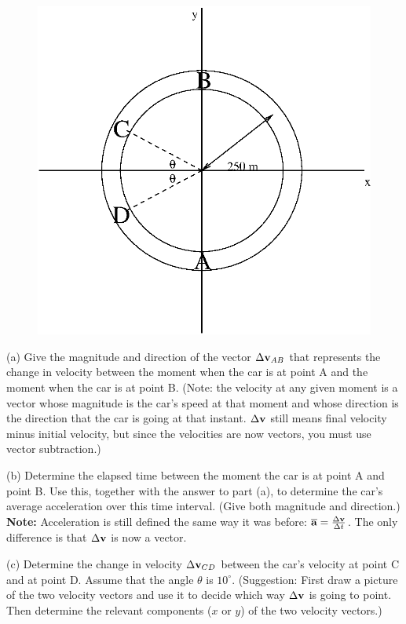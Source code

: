 \documentclass{article}
\begin{document}
\begin{figure}[h]
\centerline{\includegraphics{veclabfig.eps}}
\end{figure}

(a) Give the magnitude and direction of the vector $\Delta{\bf v}_{AB}$
that represents the change in velocity between the moment when the
car is at point A and the moment when the car is at point B.  (Note:
the velocity at any given moment is a vector whose magnitude is the
car's speed at that moment and whose direction is the direction that
the car is going at that instant.  $\Delta{\bf v}$ still means
final velocity minus initial velocity, but since the velocities are
now vectors, you must use vector subtraction.)

\vfil

(b) Determine the elapsed time between the moment the car is at point A
and point B.  Use this, together with the answer to part (a), to determine
the car's average acceleration over this time interval.  (Give both magnitude
and direction.)  {\bf Note:} Acceleration is still defined the same
way it was before: $\overline{\bf a}={\Delta {\bf v}\over\Delta t}$.
The only difference is that $\Delta{\bf v}$ is now a vector.


\vfil\eject

(c) Determine the change in velocity $\Delta {\bf v}_{CD}$ between the
car's velocity at point C and at point D.  Assume that the angle $\theta$
is $10^\circ$.  (Suggestion: First draw a picture of the two
velocity vectors and use it to decide which way
$\Delta{\bf v}$ is going to point.  Then determine the relevant
components ($x$ or $y$) of the two velocity vectors.)
\end{document}

